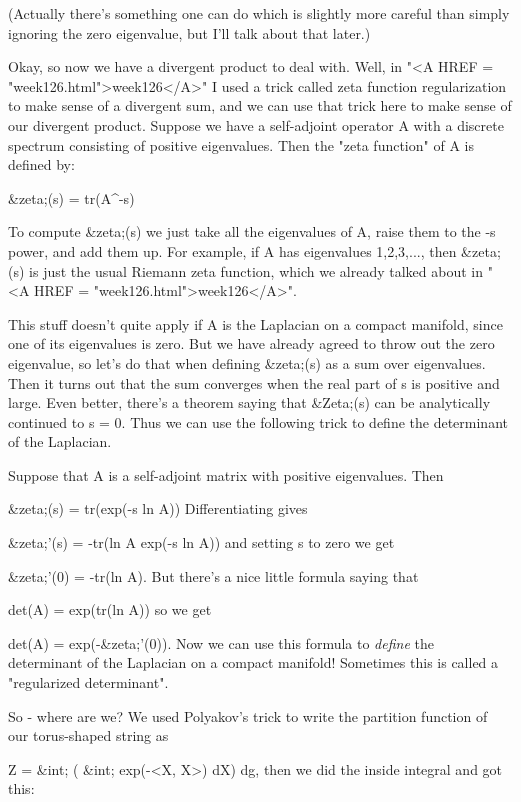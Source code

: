(Actually there's something one can do which is slightly more careful
than simply ignoring the zero eigenvalue, but I'll talk about that later.)

Okay, so now we have a divergent product to deal with.  Well, in
"<A HREF = "week126.html">week126</A>" I used a trick called
zeta function regularization to make sense of a divergent sum, and we
can use that trick here to make sense of our divergent product.  Suppose
we have a self-adjoint operator A with a discrete spectrum consisting of
positive eigenvalues.  Then the "zeta function" of A is
defined by:

                      &zeta;(s) = tr(A^{-s})

To compute &zeta;(s) we just take all the eigenvalues of A, raise them to
the -s power, and add them up.   For example, if A has eigenvalues
1,2,3,..., then &zeta;(s) is just the usual Riemann zeta function, which
we already talked about in "<A HREF = "week126.html">week126</A>".

This stuff doesn't quite apply if A is the Laplacian on a compact
manifold, since one of its eigenvalues is zero.  But we have already
agreed to throw out the zero eigenvalue, so let's do that when defining
&zeta;(s) as a sum over eigenvalues.  Then it turns out that the sum
converges when the real part of s is positive and large.  Even better,
there's a theorem saying that &Zeta;(s) can be analytically continued to 
s = 0.  Thus we can use the following trick to define the determinant of
the Laplacian.

Suppose that A is a self-adjoint matrix with positive eigenvalues.  Then

                    &zeta;(s) = tr(exp(-s ln A))
Differentiating gives

                    &zeta;'(s) = -tr(ln A exp(-s ln A))
and setting s to zero we get

                    &zeta;'(0) = -tr(ln A).
But there's a nice little formula saying that

                    det(A) = exp(tr(ln A))
so we get

                    det(A) = exp(-&zeta;'(0)).
Now we can use this formula to \emph{define} the determinant of the Laplacian
on a compact manifold!  Sometimes this is called a "regularized 
determinant".  

So - where are we?   We used Polyakov's trick to write the partition
function of our torus-shaped string as

            Z = &int; ( &int; exp(-<X, \Delta X>) dX) dg, 
then we did the inside integral and got this:


